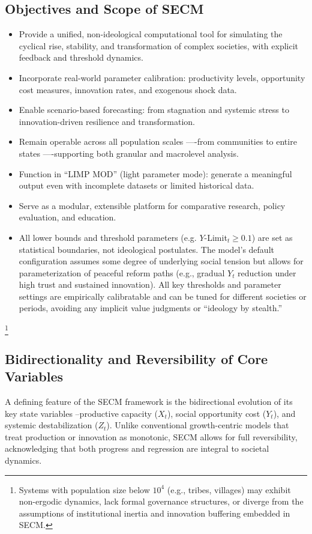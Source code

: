 \documentclass[12pt]{report}
\begin{document}
\subsection{Objectives and Scope of SECM}
\begin{itemize}
  \item Provide a unified, non-ideological computational tool for simulating the cyclical rise, stability, and transformation of complex societies, with explicit feedback and threshold dynamics.
  \item Incorporate real-world parameter calibration: productivity levels, opportunity cost measures, innovation rates, and exogenous shock data.
  \item Enable scenario-based forecasting: from stagnation and systemic stress to innovation-driven resilience and transformation.
  \item Remain operable across all population scales ----from communities to entire states ----supporting both granular and macrolevel analysis.
  \item Function in ``LIMP MOD'' (light parameter mode): generate a meaningful output even with incomplete datasets or limited historical data.
  \item Serve as a modular, extensible platform for comparative research, policy evaluation, and education.
  \item All lower bounds and threshold parameters (e.g. $Y$-Limit$_t \geq 0.1$) are set as statistical boundaries, not ideological postulates. The model's default configuration assumes some degree of underlying social tension but allows for parameterization of peaceful reform paths (e.g., gradual $Y_t$ reduction under high trust and sustained innovation). All key thresholds and parameter settings are empirically calibratable and can be tuned for different societies or periods, avoiding any implicit value judgments or ``ideology by stealth.''
\end{itemize}
\footnote{Systems with population size below $10^4$ (e.g., tribes, villages) may exhibit non-ergodic dynamics, lack formal governance structures, or diverge from the assumptions of institutional inertia and innovation buffering embedded in SECM.}

\subsection{Bidirectionality and Reversibility of Core Variables}
A defining feature of the SECM framework is the bidirectional evolution of its key state variables --productive capacity ($X_t$), social opportunity cost ($Y_t$), and systemic destabilization ($Z_t$). Unlike conventional growth-centric models that treat production or innovation as monotonic, SECM allows for full reversibility, acknowledging that both progress and regression are integral to societal dynamics.
\end{document}
